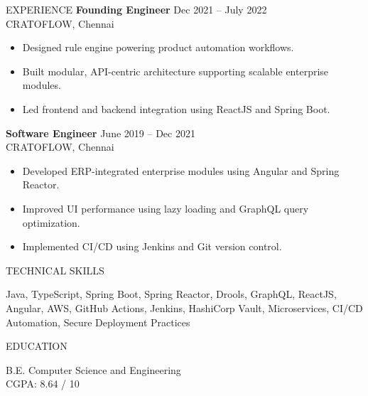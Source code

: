 \documentclass{resume}
\begin{document}
\begin{rSection}{EXPERIENCE}
\textbf{Founding Engineer} \hfill Dec 2021 – July 2022 \\
CRATOFLOW, Chennai
\begin{itemize}
\itemsep -3pt {}
\item Designed rule engine powering product automation workflows.
\item Built modular, API-centric architecture supporting scalable enterprise modules.
\item Led frontend and backend integration using ReactJS and Spring Boot.
\end{itemize}

\textbf{Software Engineer} \hfill June 2019 – Dec 2021 \\
CRATOFLOW, Chennai
\begin{itemize}
\itemsep -3pt {}
\item Developed ERP-integrated enterprise modules using Angular and Spring Reactor.
\item Improved UI performance using lazy loading and GraphQL query optimization.
\item Implemented CI/CD using Jenkins and Git version control.
\end{itemize}

\end{rSection}

\begin{rSection}{TECHNICAL SKILLS}

Java, TypeScript, Spring Boot, Spring Reactor, Drools, GraphQL, ReactJS, Angular, AWS, GitHub Actions, Jenkins, HashiCorp Vault, Microservices, CI/CD Automation, Secure Deployment Practices

\end{rSection}

\begin{rSection}{EDUCATION}

B.E. Computer Science and Engineering \\
CGPA: 8.64 / 10

\end{rSection}
\end{document}
